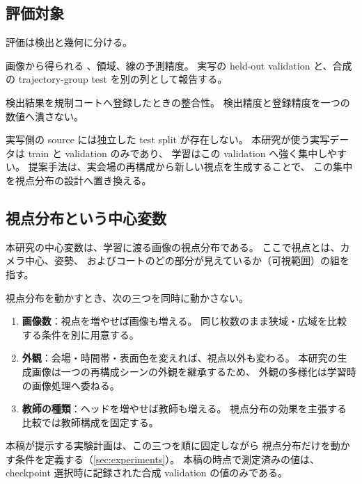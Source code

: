 \subsection{評価対象}
\label{sec:evaluation_scope}

評価は検出と幾何に分ける。

\begin{description}[leftmargin=1.6em]
  \item[検出] 画像から得られる \KPName、領域、線の予測精度。
  実写の held-out validation と、合成の trajectory-group test を別の列として報告する。
  \item[幾何] 検出結果を規制コートへ登録したときの整合性。
  検出精度と登録精度を一つの数値へ潰さない。
\end{description}

実写側の source には独立した test split が存在しない。
本研究が使う実写データは train と validation のみであり、
学習はこの validation へ強く集中しやすい。
提案手法は、実会場の再構成から新しい視点を生成することで、
この集中を視点分布の設計へ置き換える。

\subsection{視点分布という中心変数}
\label{sec:view_variable}

本研究の中心変数は、学習に渡る画像の視点分布である。
ここで視点とは、カメラ中心、姿勢、
およびコートのどの部分が見えているか（可視範囲）の組を指す。

視点分布を動かすとき、次の三つを同時に動かさない。

\begin{enumerate}[leftmargin=1.6em]
  \item \textbf{画像数}：視点を増やせば画像も増える。
  同じ枚数のまま狭域・広域を比較する条件を別に用意する。
  \item \textbf{外観}：会場・時間帯・表面色を変えれば、視点以外も変わる。
  本研究の生成画像は一つの再構成シーンの外観を継承するため、
  外観の多様化は学習時の画像処理へ委ねる。
  \item \textbf{教師の種類}：ヘッドを増やせば教師も増える。
  視点分布の効果を主張する比較では教師構成を固定する。
\end{enumerate}

本稿が提示する実験計画は、この三つを順に固定しながら
視点分布だけを動かす条件を定義する（\cref{sec:experiments}）。
本稿の時点で測定済みの値は、
checkpoint 選択時に記録された合成 validation の値のみである。
